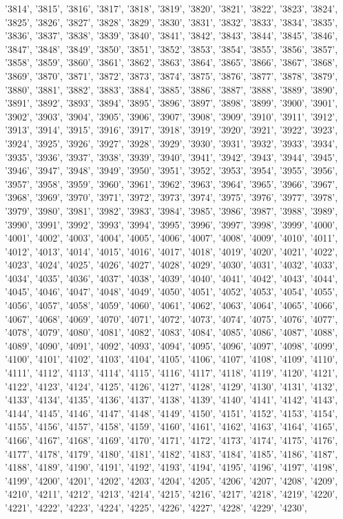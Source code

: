 '3814', '3815', '3816', '3817', '3818', '3819', '3820', '3821', '3822', '3823', '3824', '3825', '3826', '3827', '3828', '3829', '3830', '3831', '3832', '3833', '3834', '3835', '3836', '3837', '3838', '3839', '3840', '3841', '3842', '3843', '3844', '3845', '3846', '3847', '3848', '3849', '3850', '3851', '3852', '3853', '3854', '3855', '3856', '3857', '3858', '3859', '3860', '3861', '3862', '3863', '3864', '3865', '3866', '3867', '3868', '3869', '3870', '3871', '3872', '3873', '3874', '3875', '3876', '3877', '3878', '3879', '3880', '3881', '3882', '3883', '3884', '3885', '3886', '3887', '3888', '3889', '3890', '3891', '3892', '3893', '3894', '3895', '3896', '3897', '3898', '3899', '3900', '3901', '3902', '3903', '3904', '3905', '3906', '3907', '3908', '3909', '3910', '3911', '3912', '3913', '3914', '3915', '3916', '3917', '3918', '3919', '3920', '3921', '3922', '3923', '3924', '3925', '3926', '3927', '3928', '3929', '3930', '3931', '3932', '3933', '3934', '3935', '3936', '3937', '3938', '3939', '3940', '3941', '3942', '3943', '3944', '3945', '3946', '3947', '3948', '3949', '3950', '3951', '3952', '3953', '3954', '3955', '3956', '3957', '3958', '3959', '3960', '3961', '3962', '3963', '3964', '3965', '3966', '3967', '3968', '3969', '3970', '3971', '3972', '3973', '3974', '3975', '3976', '3977', '3978', '3979', '3980', '3981', '3982', '3983', '3984', '3985', '3986', '3987', '3988', '3989', '3990', '3991', '3992', '3993', '3994', '3995', '3996', '3997', '3998', '3999', '4000', '4001', '4002', '4003', '4004', '4005', '4006', '4007', '4008', '4009', '4010', '4011', '4012', '4013', '4014', '4015', '4016', '4017', '4018', '4019', '4020', '4021', '4022', '4023', '4024', '4025', '4026', '4027', '4028', '4029', '4030', '4031', '4032', '4033', '4034', '4035', '4036', '4037', '4038', '4039', '4040', '4041', '4042', '4043', '4044', '4045', '4046', '4047', '4048', '4049', '4050', '4051', '4052', '4053', '4054', '4055', '4056', '4057', '4058', '4059', '4060', '4061', '4062', '4063', '4064', '4065', '4066', '4067', '4068', '4069', '4070', '4071', '4072', '4073', '4074', '4075', '4076', '4077', '4078', '4079', '4080', '4081', '4082', '4083', '4084', '4085', '4086', '4087', '4088', '4089', '4090', '4091', '4092', '4093', '4094', '4095', '4096', '4097', '4098', '4099', '4100', '4101', '4102', '4103', '4104', '4105', '4106', '4107', '4108', '4109', '4110', '4111', '4112', '4113', '4114', '4115', '4116', '4117', '4118', '4119', '4120', '4121', '4122', '4123', '4124', '4125', '4126', '4127', '4128', '4129', '4130', '4131', '4132', '4133', '4134', '4135', '4136', '4137', '4138', '4139', '4140', '4141', '4142', '4143', '4144', '4145', '4146', '4147', '4148', '4149', '4150', '4151', '4152', '4153', '4154', '4155', '4156', '4157', '4158', '4159', '4160', '4161', '4162', '4163', '4164', '4165', '4166', '4167', '4168', '4169', '4170', '4171', '4172', '4173', '4174', '4175', '4176', '4177', '4178', '4179', '4180', '4181', '4182', '4183', '4184', '4185', '4186', '4187', '4188', '4189', '4190', '4191', '4192', '4193', '4194', '4195', '4196', '4197', '4198', '4199', '4200', '4201', '4202', '4203', '4204', '4205', '4206', '4207', '4208', '4209', '4210', '4211', '4212', '4213', '4214', '4215', '4216', '4217', '4218', '4219', '4220', '4221', '4222', '4223', '4224', '4225', '4226', '4227', '4228', '4229', '4230', 